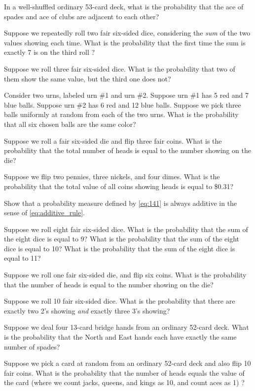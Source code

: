 \begin{exercises}
    \item In a well-shuffled ordinary 53-card deck, what is the probability that the ace of spades and ace of clubs are adjacent to each other?
    \item Suppose we repeatedly roll two fair six-sided dice, considering the \emph{sum} of the two values showing each time. What is the probability that the first time the sum is exactly 7 is on the third roll ?
    \item Suppose we roll three fair six-sided dice. What is the probability that two of them show the same value, but the third one does not?
    \item \label{exercise:1411}Consider two urns, labeled urn \#1 and urn \#2. Suppose urn \#1 has 5 red and  7 blue balls. Suppose urn \#2 has 6 red and 12 blue balls. Suppose we pick three balls uniformly at random from each of the two urns. What is the probability that all six chosen balls are the same color?
    \item Suppose we roll a fair six-sided die and flip three fair coins. What is the probability that the total number of heads is equal to the number showing on the die?
    \item Suppose we flip two pennies, three nickels, and four dimes. What is the probability that the total value of all coins showing heads is equal to \$0.31?
\end{exercises}

\begin{problems}
    \item Show that a probability measure defined by \autoref{eq:141} is always additive in the sense of \autoref{eq:additive_rule}.
    \item Suppose we roll eight fair six-sided dice. What is the probability that the sum of the eight dice is equal to 9? What is the probability that the sum of the eight dice is equal to 10? What is the probability that the sum of the eight dice is equal to 11?
    \item Suppose we roll one fair six-sided die, and flip six coins. What is the probability that the number of heads is equal to the number showing on the die?
    \item Suppose we roll 10 fair six-sided dice. What is the probability that there are exactly two 2's showing \emph{and} exactly three 3's showing?
    \item Suppose we deal four 13-card bridge hands from an ordinary 52-card deck. What is the probability that the North and East hands each have exactly the same number of spades?
    \item Suppose we pick a card at random from an ordinary 52-card deck and also flip 10 fair coins. What is the probability that the number of heads equals the value of the card (where we count jacks, queens, and kings as 10, and count aces as 1) ?
\end{problems}


